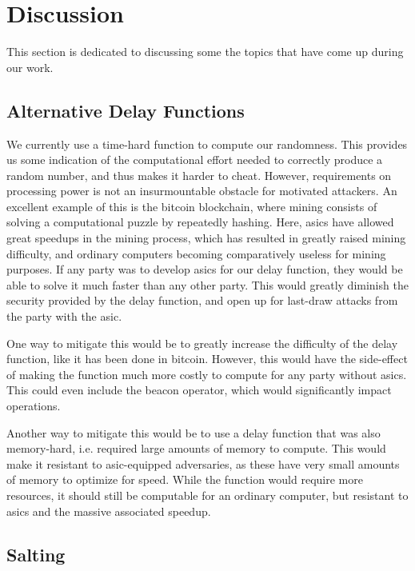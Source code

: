 \section{Discussion}%
\label{sec:discussion}
This section is dedicated to discussing some the topics that have come up during our work.

\subsection{Alternative Delay Functions}
We currently use a time-hard function to compute our randomness. This provides us some indication of the computational effort needed to correctly produce a random number, and thus makes it harder to cheat.
However, requirements on processing power is not an insurmountable obstacle for motivated attackers. An excellent example of this is the bitcoin blockchain, where mining consists of solving a computational puzzle by repeatedly hashing. Here, \acrfull{asic}s have allowed great speedups in the mining process, which has resulted in greatly raised mining difficulty, and ordinary computers becoming comparatively useless for mining purposes.
If any party was to develop \acrshort{asic}s for our delay function, they would be able to solve it much faster than any other party. This would greatly diminish the security provided by the delay function, and open up for last-draw attacks from the party with the \acrshort{asic}.

One way to mitigate this would be to greatly increase the difficulty of the delay function, like it has been done in bitcoin. However, this would have the side-effect of making the function much more costly to compute for any party without \acrshort{asic}s. This could even include the beacon operator, which would significantly impact operations.

Another way to mitigate this would be to use a delay function that was also memory-hard, i.e. required large amounts of memory to compute. This would make it resistant to \acrshort{asic}-equipped adversaries, as these have very small amounts of memory to optimize for speed. While the function would require more resources, it should still be computable for an ordinary computer, but resistant to \acrshort{asic}s and the massive associated speedup.

\subsection{Salting}

